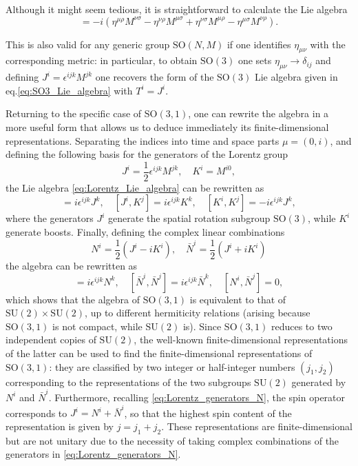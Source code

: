 Although it might seem tedious, it is straightforward to calculate the Lie algebra
\begin{equation}
    [M^{\mu\nu}, M^{\rho\sigma}] = -i (\eta^{\mu\rho} M^{\nu\sigma} - \eta^{\nu\rho} M^{\mu\sigma} + \eta^{\nu\sigma} M^{\mu\rho} - \eta^{\mu\sigma} M^{\nu\rho}).
    \label{eq:Lorentz_Lie_algebra}
\end{equation}

This is also valid for any generic group $\mathrm{SO}(N, M)$ if one identifies $\eta_{\mu\nu}$ with the corresponding metric: in particular, to obtain $\mathrm{SO}(3)$ one sets $\eta_{\mu\nu} \rightarrow \delta_{ij}$ and defining $J^i = \epsilon^{ijk} M^{jk}$ one recovers the form of the $\mathrm{SO}(3)$ Lie algebra given in eq.\eqref{eq:SO3_Lie_algebra} with $T^i = J^i$.

Returning to the specific case of $\mathrm{SO}(3,1)$, one can rewrite the algebra in a more useful form that allows us to deduce immediately its finite-dimensional representations. Separating the indices into time and space parts $\mu = (0,i)$, and defining the following basis for the generators of the Lorentz group
\[
    J^i = \frac{1}{2} \epsilon^{ijk} M^{jk}, \quad K^i = M^{i0},
\]
the Lie algebra \eqref{eq:Lorentz_Lie_algebra} can be rewritten as
\begin{equation}
    [J^i, J^j] = i \epsilon^{ijk} J^k, \quad [J^i, K^j] = i \epsilon^{ijk} K^k, \quad [K^i, K^j] = -i \epsilon^{ijk} J^k,
    \label{eq:Lorentz_Lie_algebra_JK}
\end{equation}
where the generators $J^i$ generate the spatial rotation subgroup $\mathrm{SO}(3)$, while \(K^i\) generate boosts. Finally, defining the complex linear combinations
\begin{equation}
    N^i = \frac{1}{2}(J^i - i K^i), \quad \bar{N}^i = \frac{1}{2}(J^i + i K^i)
    \label{eq:Lorentz_generators_N}
\end{equation}
the algebra can be rewritten as
\begin{equation}
    [N^i, N^j] = i \epsilon^{ijk} N^k, \quad [\bar{N}^i, \bar{N}^j] = i \epsilon^{ijk} \bar{N}^k, \quad [N^i, \bar{N}^j] = 0,
    \label{eq:Lorentz_Lie_algebra_N}
\end{equation}
which shows that the algebra of $\mathrm{SO}(3,1)$ is equivalent to that of $\mathrm{SU}(2) \times \mathrm{SU}(2)$, up to different hermiticity relations (arising because $\mathrm{SO}(3,1)$ is not compact, while $\mathrm{SU}(2)$ is). Since $\mathrm{SO}(3,1)$ reduces to two independent copies of $\mathrm{SU}(2)$, the well-known finite-dimensional representations of the latter can be used to find the finite-dimensional representations of $\mathrm{SO}(3,1)$: they are classified by two integer or half-integer numbers $(j_1, j_2)$ corresponding to the representations of the two subgroups $\mathrm{SU}(2)$ generated by $N^i$ and $\bar{N}^i$. Furthermore, recalling \eqref{eq:Lorentz_generators_N}, the spin operator corresponds to $J^i = N^i + \bar{N}^i$, so that the highest spin content of the representation is given by $j = j_1 + j_2$. These representations are finite-dimensional but are not unitary due to the necessity of taking complex combinations of the generators in \eqref{eq:Lorentz_generators_N}.

